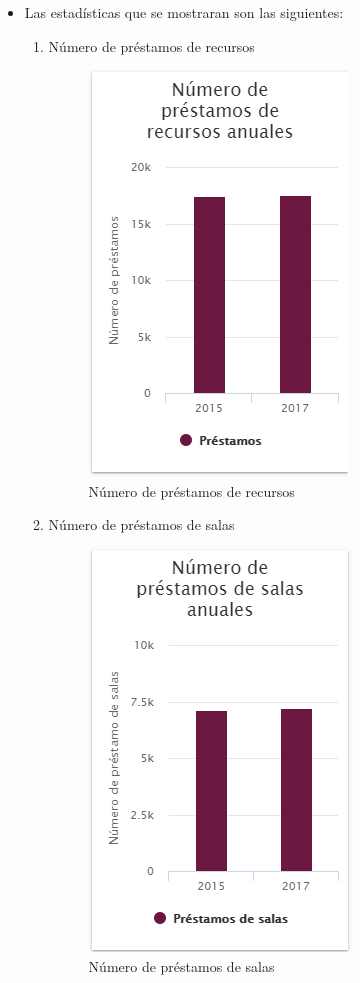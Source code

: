\begin{itemize}
	\item  Las estadísticas que se mostraran son las siguientes:
	\begin{enumerate}
		
		\item Número de préstamos de recursos
		\begin{figure}[hbtp]
	\includegraphics[scale=0.7]{images/InterfazMovil/IUGS15_recursosAnos.PNG}
	\caption{Número de préstamos de recursos}
	\end{figure}
	
	\item Número de préstamos de salas
	\begin{figure}[hbtp]
	\includegraphics[scale=0.7]{images/InterfazMovil/IUGS15_salasAnos.PNG}
	\caption{Número de préstamos de salas}
	\end{figure}
	

\end{enumerate}
\end{itemize}
